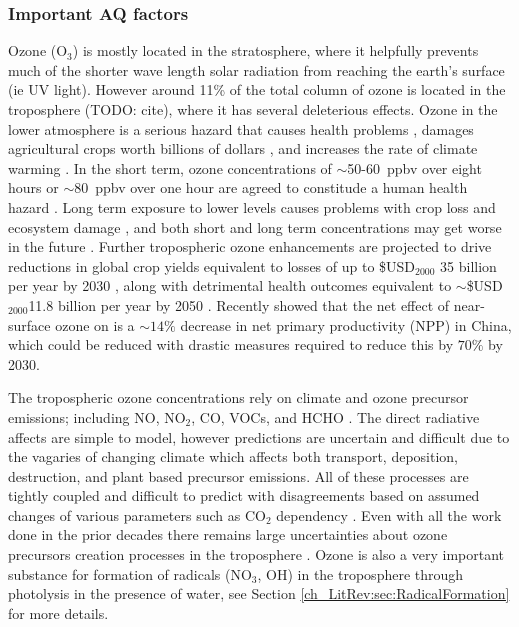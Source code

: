     \subsubsection{Important AQ factors} 
      \label{LR:sec:AQfactors}
      Ozone (O$_3$) is mostly located in the stratosphere, where it helpfully prevents much of the shorter wave length solar radiation from reaching the earth's surface (ie UV light).
      However around 11\% of the total column of ozone is located in the troposphere (TODO: cite), where it has several deleterious effects.
      Ozone in the lower atmosphere is a serious hazard that causes health problems \citep{Hsieh2013}, damages agricultural crops worth billions of dollars \citep{Avnery2011,Yue2017}, and increases the rate of climate warming \citep{IPCC_2013_chap8}.
      In the short term, ozone concentrations of $\sim$50-60~ppbv over eight hours or $\sim$80~ppbv over one hour are agreed to constitude a human health hazard \citep{Ayers2006,Lelieveld2009}. 
      Long term exposure to lower levels causes problems with crop loss and ecosystem damage \citep{Emberson2003}, and both short and long term concentrations may get worse in the future \citep{Lelieveld2009, Stevenson2013}.
      Further tropospheric ozone enhancements are projected to drive reductions in global crop yields equivalent to losses of up to \$USD$_{2000}$ 35 billion per year by 2030 \citep{Avnery2011}, along with detrimental health outcomes equivalent to $\sim$\$USD$_{2000}$11.8 billion per year by 2050 \citep{Selin2009}.
      Recently \cite{Yue2017} showed that the net effect of near-surface ozone on is a $\sim 14\%$ decrease in net primary productivity (NPP) in China, which could be reduced with drastic measures required to reduce this by $70\%$ by 2030.
      
      The tropospheric ozone concentrations rely on climate and ozone precursor emissions; including NO, NO$_2$, CO, VOCs, and HCHO \citep{Atkinson2000, Young2013, Marvin2017}. 
      The direct radiative affects are simple to model, however predictions are uncertain and difficult due to the vagaries of changing climate which affects both transport, deposition, destruction, and plant based precursor emissions.
      All of these processes are tightly coupled and difficult to predict with disagreements based on assumed changes of various parameters such as CO$_2$ dependency \citep{Young2013}.
      Even with all the work done in the prior decades there remains large uncertainties about ozone precursors creation processes in the troposphere \citep{Mazzuca2016}.
      Ozone is also a very important substance for formation of radicals (NO$_3$, OH) in the troposphere through photolysis in the presence of water, see Section \ref{ch_LitRev:sec:RadicalFormation} for more details.
      
